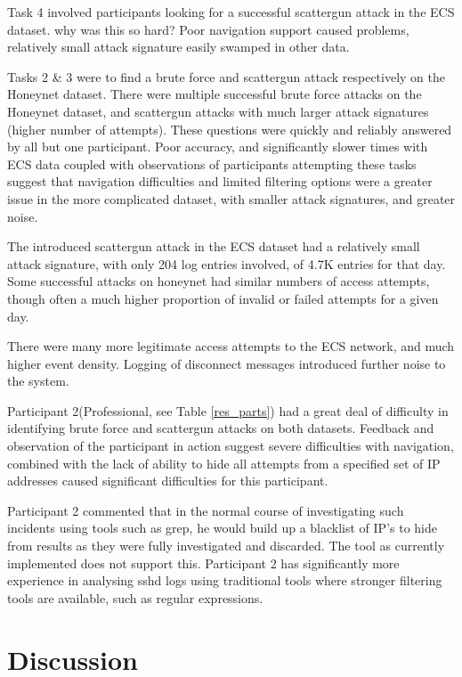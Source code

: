 Task 4 involved participants looking for a successful scattergun attack in the ECS dataset. why was this so hard? Poor navigation support caused problems, relatively small attack signature easily swamped in other data.

Tasks 2 \& 3 were to find a brute force and scattergun attack respectively on the Honeynet dataset.
There were multiple successful brute force attacks on the Honeynet dataset, and scattergun attacks with much larger attack signatures (higher number of attempts). These questions were quickly and reliably answered by all but one participant. Poor accuracy, and significantly slower times with ECS data coupled with observations of participants attempting these tasks suggest that navigation difficulties and limited filtering options were a greater issue in the more complicated dataset, with smaller attack signatures, and greater noise. 

The introduced scattergun attack in the ECS dataset had a relatively small attack signature, with only 204 log entries involved, of 4.7K entries for that day. Some successful attacks on honeynet had similar numbers of access attempts, though often a much higher proportion of invalid or failed attempts for a given day. 

There were many more legitimate access attempts to the ECS network, and much higher event density. Logging of disconnect messages introduced further noise to the system. 

Participant 2(Professional, see Table \ref{res_parts}) had a great deal of difficulty in identifying brute force and scattergun attacks on both datasets. Feedback and observation of the participant in action suggest severe difficulties with navigation, combined with the lack of ability to hide all attempts from a specified set of IP addresses caused significant difficulties for this participant.

Participant 2 commented that in the normal course of investigating such incidents using tools such as grep, he would build up a blacklist of IP's to hide from results as they were fully investigated and discarded.
The tool as currently implemented does not support this. Participant 2 has significantly more experience in analysing sshd logs using traditional tools where stronger filtering tools are available, such as regular expressions. 

\section{Discussion} 

